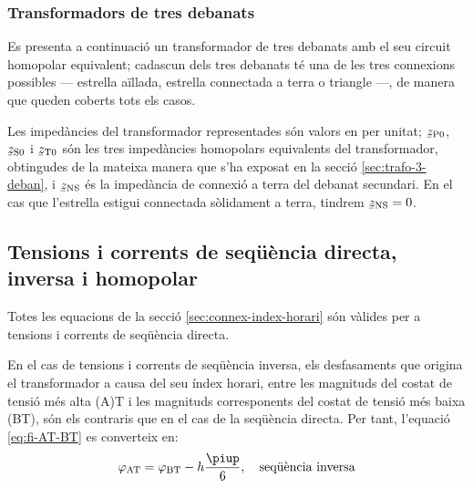 \begin{center}
    
\end{center}


\subsubsection{Transformadors de tres debanats}\label{sec:cir-hom-3-deb}

Es presenta a continuació un transformador de tres debanats amb el seu circuit homopolar equivalent; cadascun dels tres debanats té una de les tres connexions possibles --- estrella aïllada, estrella connectada a terra o triangle ---, de manera que queden coberts tots els casos.

Les impedàncies del transformador representades són valors en per unitat; $\cmplx{z}\ped{P0}$, $\cmplx{z}\ped{S0}$ i $\cmplx{z}\ped{T0}$ són les tres impedàncies homopolars equivalents del transformador, obtingudes de la mateixa manera que s'ha exposat en la secció \ref{sec:trafo-3-deban}, i $\cmplx{z}\ped{NS}$ és  la impedància de connexió a terra del debanat secundari. En el cas que l'estrella estigui connectada sòlidament a terra, tindrem $\cmplx{z}\ped{NS}=0$.

\begin{center}
    
\end{center}


\subsection{Tensions i corrents de seqüència directa, inversa i homopolar}

Totes les equacions de la secció \vref{sec:connex-index-horari} són vàlides per a tensions i corrents de seqüència directa.

En el cas de tensions i corrents de seqüència inversa, els desfasaments que origina el transformador a causa del seu índex horari, entre les magnituds  del costat de tensió més alta (A)T i les magnituds corresponents del costat de tensió més baixa (BT), són els contraris que en el cas de la seqüència directa. Per tant, l'equació  \eqref{eq:fi-AT-BT} es converteix en:
\begin{equation}
    \varphi\ped{AT} = \varphi\ped{BT} - h\frac{\piup}{6}, \quad\text{seqüència inversa}
\end{equation}

